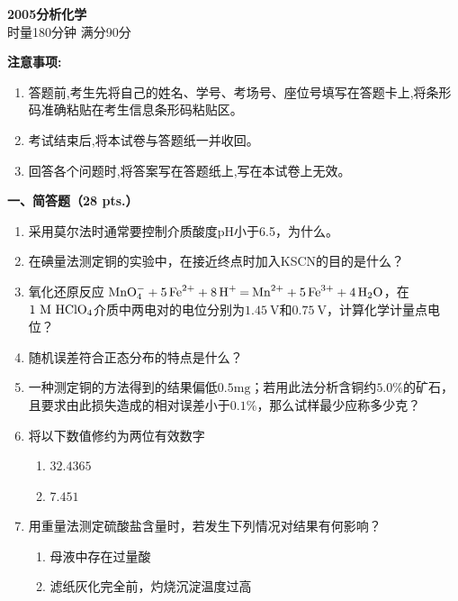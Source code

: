 \begin{center}
    {\LARGE \textbf{2005分析化学}} \\[2ex]
    {\large 时量180分钟 \quad 满分90分}
\end{center}

\vspace{0.5cm}
\noindent\textbf{注意事项:}
\begin{enumerate}[label=\arabic*., parsep=0pt, itemsep=0pt]
    \item 答题前,考生先将自己的姓名、学号、考场号、座位号填写在答题卡上,将条形码准确粘贴在考生信息条形码粘贴区。
    \item 考试结束后,将本试卷与答题纸一并收回。
    \item 回答各个问题时,将答案写在答题纸上,写在本试卷上无效。
\end{enumerate}

\vspace{0.5cm}
\noindent\textbf{一、简答题（28 pts.）}

\begin{enumerate}[label=\arabic*., itemsep=1.5ex]
    \item 采用莫尔法时通常要控制介质酸度pH小于6.5，为什么。
    \item 在碘量法测定铜的实验中，在接近终点时加入KSCN的目的是什么？
    \item 氧化还原反应 $\ce{MnO^-_{4} + 5Fe^{2+} + 8H^{+} = Mn^{2+} + 5Fe^{3+} + 4H_{2}O}$，在$1\ \mathrm{M}\ \ce{HClO_{4}}$介质中两电对的电位分别为$1.45\ \mathrm{V}$和$0.75\ \mathrm{V}$，计算化学计量点电位？
    \item 随机误差符合正态分布的特点是什么？
    \item 一种测定铜的方法得到的结果偏低$0.5\mathrm{mg}$；若用此法分析含铜约$5.0\%$的矿石，且要求由此损失造成的相对误差小于$0.1\%$，那么试样最少应称多少克？
    \item 将以下数值修约为两位有效数字
    \begin{enumerate}[label=(\arabic*), noitemsep, topsep=0pt, partopsep=0pt]
        \item $32.4365$
        \item $7.451$
    \end{enumerate}
    \item 用重量法测定硫酸盐含量时，若发生下列情况对结果有何影响？
    \begin{enumerate}[label=(\arabic*), noitemsep, topsep=0pt, partopsep=0pt]
        \item 母液中存在过量酸
        \item 滤纸灰化完全前，灼烧沉淀温度过高
    \end{enumerate}
\end{enumerate}

